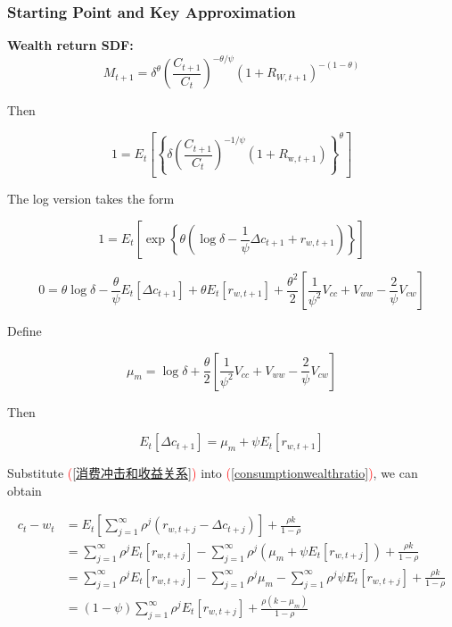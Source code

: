 \documentclass{beamer}
\begin{document}
\begin{frame}[allowframebreaks]
    \frametitle{Starting Point and Key Approximation}
    
    \textbf{Wealth return SDF:}
    \begin{equation*}
        M_{t+1} = \delta^{\theta} \left( \frac{C_{t+1}}{C_t} \right)^{-\theta/\psi} (1 + R_{W,t+1})^{-(1-\theta)}
    \end{equation*}

    Then 

    \begin{equation*}
        1=E_t\left[\left\{\delta\left(\frac{C_{t+1}}{C_t}\right)^{-1 / \psi}  (1 + R_{\mathrm{w}, t+1})\right\}^\theta\right]
    \end{equation*}

    The log version takes the form 

    \begin{equation*}
1=E_t\left[\exp \left\{\theta\left(\log \delta-\frac{1}{\psi} \Delta c_{t+1}+r_{w, t+1}\right)\right\}\right]
\end{equation*}

    \framebreak

\begin{equation*}
0 = \theta\log\delta - \frac{\theta}{\psi}E_t[\Delta c_{t+1}] + \theta E_t[r_{w,t+1}]  + \frac{\theta^2}{2}\left[\frac{1}{\psi^2}V_{cc} + V_{ww} - \frac{2}{\psi}V_{cw}\right] 
\end{equation*}

Define

\begin{equation*}
\mu_m=\log \delta+\frac{\theta}{2}\left[\frac{1}{\psi^2} V_{c c}+V_{w w}-\frac{2}{\psi} V_{c w}\right]
\end{equation*}

Then

\begin{equation}
E_t\left[\Delta c_{t+1}\right]=\mu_m+\psi E_t\left[r_{w, t+1}\right]\label{消费冲击和收益关系}
\end{equation}

\framebreak

Substitute \textcolor{red}{(\ref{消费冲击和收益关系})} into \textcolor{red}{(\ref{consumptionwealthratio})}, we can obtain

\begin{equation}
\begin{aligned}
  c_t - w_t &= E_t \left[\sum_{j=1}^{\infty} \rho^{j}\left(r_{w, t+j}-\Delta c_{t+j}\right)\right] +\frac{\rho k}{1-\rho} \\
&= \sum_{j=1}^{\infty} \rho^{j} E_t[r_{w, t+j}] - \sum_{j=1}^{\infty} \rho^{j} (\mu_m + \psi E_t[r_{w,t+j}]) +\frac{\rho k}{1-\rho}\\
&= \sum_{j=1}^{\infty} \rho^{j} E_t[r_{w, t+j}] - \sum_{j=1}^{\infty} \rho^{j} \mu_m - \sum_{j=1}^{\infty} \rho^{j} \psi E_t[r_{w,t+j}] +\frac{\rho k}{1-\rho}\\
&= (1-\psi) \sum_{j=1}^{\infty} \rho^{j} E_t[r_{w, t+j}] + \frac{\rho(k - \mu_m)}{1-\rho}
\end{aligned}  
\end{equation}


\end{frame}
\end{document}
